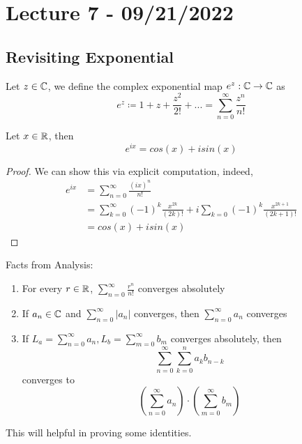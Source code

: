 \section{Lecture 7 - 09/21/2022}

\subsection{Revisiting Exponential}

\begin{definition}
    Let $z \in \mathbb{C}$, we define the complex exponential map $e^z: \mathbb{C} \to \mathbb{C}$ as
    \[e^z \coloneqq 1 + z + \frac{z^2}{2!} + ... = \sum_{n = 0}^\infty \frac{z^n}{n!}\]
\end{definition}

\begin{theorem}
Let $x \in \mathbb{R}$, then
\[e^{ix} = cos(x) + i sin(x)\]
\end{theorem}

\begin{proof}
We can show this via explicit computation, indeed,
\begin{align*}
    e^{ix} &= \sum_{n = 0}^\infty \frac{(ix)^n}{n!}\\
    &= \sum_{k = 0}^\infty (-1)^k \frac{x^{2k}}{(2k)!} + i \sum_{k = 0} (-1)^k \frac{x^{2k + 1}}{(2k + 1)!} \tag*{Separate even and odd degree terms}\\
    &= cos(x) + i sin(x) \tag*{Taylor Series}
\end{align*}
\end{proof}

\begin{lemma}\label{lem::real_analy_fact}
Facts from Analysis:
\begin{enumerate}
    \item For every $r \in \mathbb{R}$, $\sum_{n = 0}^\infty \frac{r^n}{n!}$ converges absolutely
    \item If $a_n \in \mathbb{C}$ and $\sum_{n = 0}^\infty |a_n|$ converges, then $\sum_{n = 0}^\infty a_n$ converges
    \item If $L_a = \sum_{n = 0}^\infty a_n, L_b = \sum_{m = 0}^\infty b_m$ converges absolutely, then
    \[\sum_{n = 0}^\infty \sum_{k = 0}^n a_k b_{n - k}\]
    converges to
    \[(\sum_{n = 0}^\infty a_n) \cdot (\sum_{m = 0}^\infty b_m)\]
\end{enumerate}
This will helpful in proving some identities.
\end{lemma}

